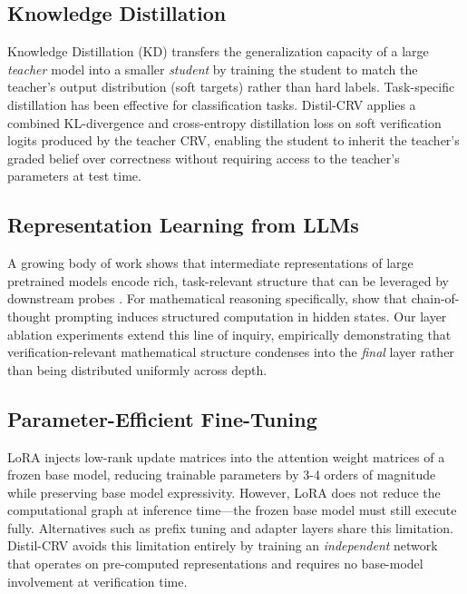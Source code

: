 \documentclass{article}
\begin{document}
\subsection{Knowledge Distillation}
Knowledge Distillation (KD) \citep{hinton2015distilling} transfers the generalization capacity of a large \emph{teacher} model into a smaller \emph{student} by training the student to match the teacher's output distribution (soft targets) rather than hard labels. Task-specific distillation \citep{tang2019distilling, sanh2019distilbert} has been effective for classification tasks. Distil-CRV applies a combined KL-divergence and cross-entropy distillation loss on soft verification logits produced by the teacher CRV, enabling the student to inherit the teacher's graded belief over correctness without requiring access to the teacher's parameters at test time.

\subsection{Representation Learning from LLMs}
A growing body of work shows that intermediate representations of large pretrained models encode rich, task-relevant structure that can be leveraged by downstream probes \citep{tenney2019bert, jawahar2019does}. For mathematical reasoning specifically, \citet{goyal2023think} show that chain-of-thought prompting induces structured computation in hidden states. Our layer ablation experiments extend this line of inquiry, empirically demonstrating that verification-relevant mathematical structure condenses into the \emph{final} layer rather than being distributed uniformly across depth.

\subsection{Parameter-Efficient Fine-Tuning}
LoRA \citep{hu2021lora} injects low-rank update matrices into the attention weight matrices of a frozen base model, reducing trainable parameters by 3-4 orders of magnitude while preserving base model expressivity. However, LoRA does not reduce the computational graph at inference time---the frozen base model must still execute fully. Alternatives such as prefix tuning \citep{li2021prefix} and adapter layers \citep{houlsby2019parameter} share this limitation. Distil-CRV avoids this limitation entirely by training an \emph{independent} network that operates on pre-computed representations and requires no base-model involvement at verification time.
\end{document}
